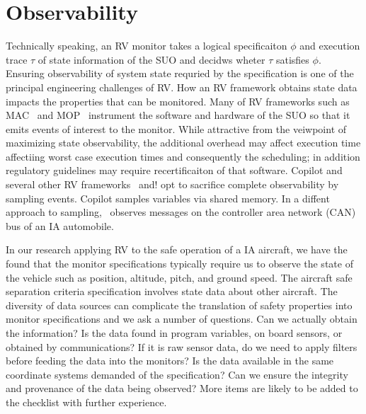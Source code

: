 \section{Observability}\label{sec:observ} 

\noindent{} Technically speaking, an RV monitor takes a logical specificaiton
  $\phi$ and execution trace $\tau$ of state information of the SUO
  and decidws wheter $\tau$ satisfies $\phi$.  Ensuring observability of
  system state requried by the specification is one of the principal
  engineering challenges of RV.  How an RV framework obtains state
  data impacts the properties that can be monitored. Many of RV
  frameworks such as MAC~\cite{KimLKS04}  and MOP~\cite{ChenR05}
  instrument the software and hardware of the SUO so that it emits
  events of interest to the monitor.  While attractive from the
  veiwpoint of maximizing state observability, the additional overhead
  may affect execution time affectiing worst case
  execution times and consequently the scheduling; in addition regulatory
  guidelines may require recertificaiton of that software.  Copilot
  and several other RV frameworks~\cite{sampling} and!\cite{borzoo}
  opt to sacrifice complete observability by sampling
  events.  Copilot samples variables via shared memory. In a diffent approach
  to sampling,~\cite{Kane15} observes messages on  the controller area
  network (CAN)  bus of  an IA
  automobile.   


  In our research applying RV to  the safe operation of a IA aircraft,
  we have the found that  the monitor specifications typically require
  us to observe  the state of the vehicle such  as position, altitude,
  pitch,  and ground  speed.   The aircraft  safe separation  criteria
  specification  involves   state  data  about  other   aircraft.  The
  diversity of data  sources can complicate the  translation of safety
  properties  into  monitor specifications  and  we  ask a  number  of
  questions.  Can  we actually  obtain the  information?  Is  the data
  found  in  program  variables,  on board  sensors,  or  obtained  by
  communications?  If it  is  raw sensor  data, do  we  need to  apply
  filters  before feeding  the data  into  the monitors?  Is the  data
  available   in  the   same  coordinate   systems  demanded   of  the
  specification?  Can  we ensure the  integrity and provenance  of the
  data  being observed?  More  items are  likely to  be  added to  the
  checklist with further experience.


